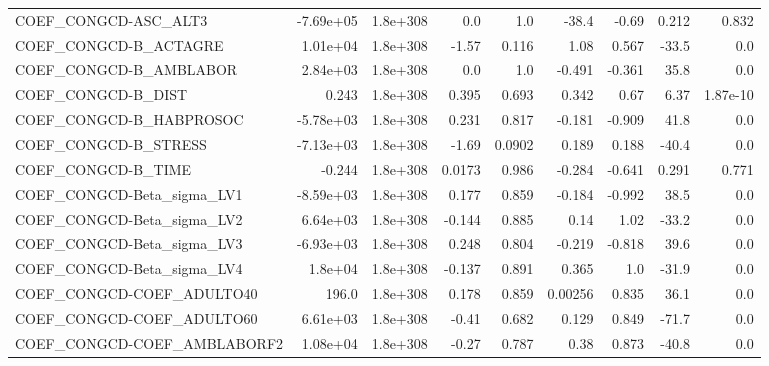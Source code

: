 \begin{tabular}{lrrrrrrrr}
COEF\_CONGCD-ASC\_ALT3              &   -7.69e+05 &     1.8e+308 &      0.0 &      1.0 &      -38.4 &       -0.69 &        0.212 &         0.832 \\
COEF\_CONGCD-B\_ACTAGRE             &    1.01e+04 &     1.8e+308 &    -1.57 &    0.116 &       1.08 &       0.567 &        -33.5 &           0.0 \\
COEF\_CONGCD-B\_AMBLABOR            &    2.84e+03 &     1.8e+308 &      0.0 &      1.0 &     -0.491 &      -0.361 &         35.8 &           0.0 \\
COEF\_CONGCD-B\_DIST                &       0.243 &     1.8e+308 &    0.395 &    0.693 &      0.342 &        0.67 &         6.37 &      1.87e-10 \\
COEF\_CONGCD-B\_HABPROSOC           &   -5.78e+03 &     1.8e+308 &    0.231 &    0.817 &     -0.181 &      -0.909 &         41.8 &           0.0 \\
COEF\_CONGCD-B\_STRESS              &   -7.13e+03 &     1.8e+308 &    -1.69 &   0.0902 &      0.189 &       0.188 &        -40.4 &           0.0 \\
COEF\_CONGCD-B\_TIME                &      -0.244 &     1.8e+308 &   0.0173 &    0.986 &     -0.284 &      -0.641 &        0.291 &         0.771 \\
COEF\_CONGCD-Beta\_sigma\_LV1        &   -8.59e+03 &     1.8e+308 &    0.177 &    0.859 &     -0.184 &      -0.992 &         38.5 &           0.0 \\
COEF\_CONGCD-Beta\_sigma\_LV2        &    6.64e+03 &     1.8e+308 &   -0.144 &    0.885 &       0.14 &        1.02 &        -33.2 &           0.0 \\
COEF\_CONGCD-Beta\_sigma\_LV3        &   -6.93e+03 &     1.8e+308 &    0.248 &    0.804 &     -0.219 &      -0.818 &         39.6 &           0.0 \\
COEF\_CONGCD-Beta\_sigma\_LV4        &     1.8e+04 &     1.8e+308 &   -0.137 &    0.891 &      0.365 &         1.0 &        -31.9 &           0.0 \\
COEF\_CONGCD-COEF\_ADULTO40         &       196.0 &     1.8e+308 &    0.178 &    0.859 &    0.00256 &       0.835 &         36.1 &           0.0 \\
COEF\_CONGCD-COEF\_ADULTO60         &    6.61e+03 &     1.8e+308 &    -0.41 &    0.682 &      0.129 &       0.849 &        -71.7 &           0.0 \\
COEF\_CONGCD-COEF\_AMBLABORF2       &    1.08e+04 &     1.8e+308 &    -0.27 &    0.787 &       0.38 &       0.873 &        -40.8 &           0.0 \\

\end{tabular}
